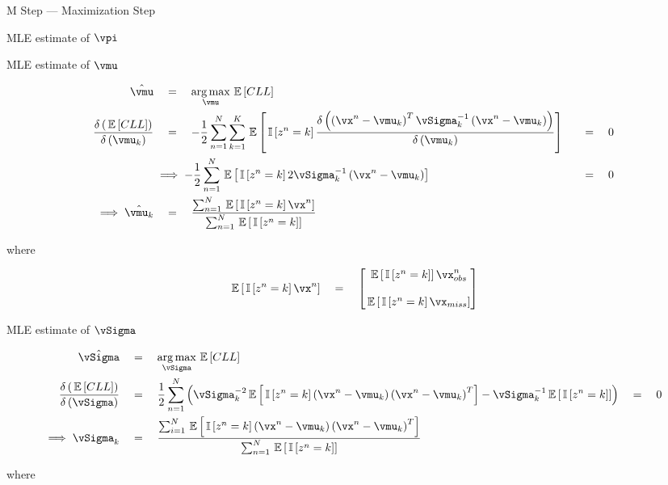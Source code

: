 \documentclass{article}
\begin{document}
\begin{question}
\begin{qsection}{M Step --- Maximization Step}
\begin{qsubsection}{MLE estimate of $\vpi$}
		\end{qsubsection}

		\begin{qsubsection}{MLE estimate of $\vmu$}

			\begin{align*}
				\hat{\vmu}					&\eq		\argmax_{\vmu} \E{CLL} \\
				\derp{\E{CLL}}{\vmu_k}		&\eq		- \frac{1}{2} \sum_{n = 1}^{N} \sum_{k = 1}^{K} \E{\is{z^n = k} \derp{\para{\vx^n - \vmu_k}^T \vSigma_k^{-1} \para{\vx^n - \vmu_k}}{\vmu_k}} 	&\eq	0 \\
											&\implies	- \frac{1}{2} \sum_{n = 1}^{N} \E{\is{z^n = k} 2 \vSigma_k^{-1} \para{\vx^n - \vmu_k}}															&\eq	0 \\
				\implies	\hat{\vmu_k}	&\eq		\frac{\sum_{n = 1}^{N} \E{\is{z^n = k} \vx^n}}{\sum_{n = 1}^{N} \E{\is{z^n = k}}}
			\end{align*}

			where

			\begin{align*}
				\E{\is{z^n = k} \vx^n}	\eq	\begin{bmatrix}
											\E{\is{z^n = k}} \vx_{obs}^n \\\\
											\E{\is{z^n = k} \vx_{miss}}
										\end{bmatrix}
			\end{align*}
			
		\end{qsubsection}

		\begin{qsubsection}{MLE estimate of $\vSigma$}

			\begin{align*}
				\hat{\vSigma}			&\eq	\argmax_{\vSigma} \E{CLL} \\
				\derp{\E{CLL}}{\vSigma}	&\eq	\frac{1}{2} \sum_{n = 1}^{N} \para{\vSigma_k^{-2} \E{\is{z^n = k} \para{\vx^n - \vmu_k} \para{\vx^n - \vmu_k}^T} - \vSigma_k^{-1} \E{\is{z^n = k}}} \eq 0 \\
				\implies \vSigma_k		&\eq 	\frac{\sum_{i = 1}^{N} \E{\is{z^n = k} \para{\vx^n - \vmu_k} \para{\vx^n - \vmu_k}^T}}{\sum_{n = 1}^{N} \E{\is{z^n = k}}}
			\end{align*}

			where


\end{qsubsection}
\end{qsection}
\end{question}
\end{document}
